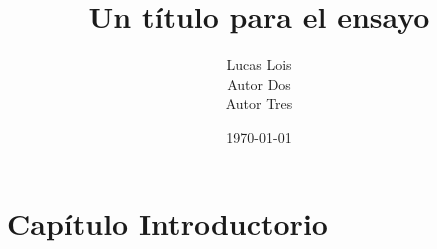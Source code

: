 \documentclass[12pt]{report}
\title{Un título para el ensayo}
\author{
	Lucas Lois\\
	Autor Dos\\
	Autor Tres
}
\date{\today}
\begin{document}

\tableofcontents
\chapter{Capítulo Introductorio}

\blindtext \parencite{coulouris}

\pagebreak
\printbibliography{}
\end{document}
